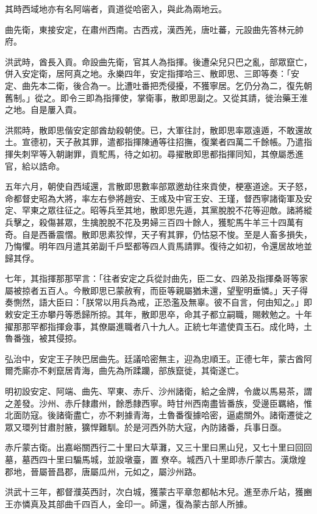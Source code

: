 \begin{pinyinscope}
其時西域地亦有名阿端者，貢道從哈密入，與此為兩地云。

曲先衛，東接安定，在肅州西南。古西戎，漢西羌，唐吐蕃，元設曲先答林元帥府。

洪武時，酋長入貢。命設曲先衛，官其人為指揮。後遭朵兒只巴之亂，部眾竄亡，併入安定衛，居阿真之地。永樂四年，安定指揮哈三、散即思、三即等奏：「安定、曲先本二衛，後合為一。比遭吐番把禿侵擾，不獲寧居。乞仍分為二，復先朝舊制。」從之。即令三即為指揮使，掌衛事，散即思副之。又從其請，徙治藥王淮之地。自是屢入貢。

洪熙時，散即思偕安定部酋劫殺朝使。已，大軍往討，散即思率眾遠遁，不敢還故土。宣德初，天子赦其罪，遣都指揮陳通等往招撫，復業者四萬二千餘帳。乃遣指揮失刺罕等入朝謝罪，貢駝馬，待之如初。尋擢散即思都指揮同知，其僚屬悉進官，給以誥命。

五年六月，朝使自西域還，言散即思數率部眾邀劫往來貢使，梗塞道途。天子怒，命都督史昭為大將，率左右參將趙安、王彧及中官王安、王瑾，督西寧諸衛軍及安定、罕東之眾往征之。昭等兵至其地，散即思先遁，其黨脫脫不花等迎敵。諸將縱兵擊之，殺傷甚眾，生擒脫脫不花及男婦三百四十餘人，獲駝馬牛羊三十四萬有奇。自是西番震慴。散即思素狡悍，天子宥其罪，仍怙惡不悛。至是人畜多損失，乃悔懼。明年四月遣其弟副千戶堅都等四人貢馬請罪。復待之如初，令還居故地並歸其俘。

七年，其指揮那那罕言：「往者安定之兵從討曲先，臣二女、四弟及指揮桑哥等家屬被掠者五百人。今散即思已蒙赦宥，而臣等親屬猶未還，望聖明垂憐。」天子得奏惻然，語大臣曰：「朕常以用兵為戒，正恐濫及無辜。彼不自言，何由知之。」即敕安定王亦攀丹等悉歸所掠。其年，散即思卒，命其子都立嗣職，賜敕勉之。十年擢那那罕都指揮僉事，其僚屬進職者八十九人。正統七年遣使貢玉石。成化時，土魯番強，被其侵掠。

弘治中，安定王子陜巴居曲先。廷議哈密無主，迎為忠順王。正德七年，蒙古酋阿爾禿廝亦不剌竄居青海，曲先為所蹂躪，部族竄徙，其衛遂亡。

明初設安定、阿端、曲先、罕東、赤斤、沙州諸衛，給之金牌，令歲以馬易茶，謂之差發。沙州、赤斤隸肅州，餘悉隸西寧。時甘州西南盡皆番族，受邊臣羈絡，惟北面防寇。後諸衛盡亡，亦不剌據青海，土魯番復據哈密，逼處關外。諸衛遷徙之眾又環列甘肅肘腋，獷悍難馴。於是河西外防大寇，內防諸番，兵事日亟。

赤斤蒙古衛。出嘉峪關西行二十里曰大草灘，又三十里曰黑山兒，又七十里曰回回墓，墓西四十里曰騸馬城，並設墩臺，置尞卒。城西八十里即赤斤蒙古。漢燉煌郡地，晉屬晉昌郡，唐屬瓜州，元如之，屬沙州路。

洪武十三年，都督濮英西討，次白城，獲蒙古平章忽都帖木兒。進至赤斤站，獲豳王亦憐真及其部曲千四百人，金印一。師還，復為蒙古部人所據。


\end{pinyinscope}
